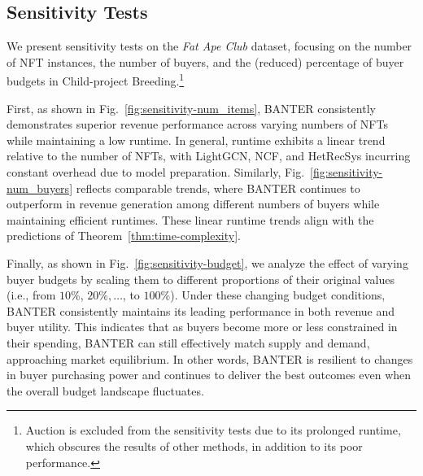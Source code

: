 \documentclass[conference]{IEEEtran}
\theoremstyle{plain}
\begin{document}
{\subsection{Sensitivity Tests}

We present sensitivity tests on the \textit{Fat Ape Club} dataset, focusing on the number of NFT instances, the number of buyers, and the (reduced) percentage of buyer budgets in Child-project Breeding\xspace.\footnote{\textsf{Auction} is excluded from the sensitivity tests due to its prolonged runtime, which obscures the results of other methods, in addition to its poor performance.} 

First, as shown in Fig.~\ref{fig:sensitivity-num_items}, BANTER\xspace consistently demonstrates superior revenue performance across varying numbers of NFTs while maintaining a low runtime. In general, runtime exhibits a linear trend relative to the number of NFTs, with \textsf{LightGCN}, \textsf{NCF}, and \textsf{HetRecSys} incurring constant overhead due to model preparation. Similarly, Fig.~\ref{fig:sensitivity-num_buyers} reflects comparable trends, where BANTER\xspace continues to outperform in revenue generation among different numbers of buyers while maintaining efficient runtimes. These linear runtime trends align with the predictions of Theorem~\ref{thm:time-complexity}. 

Finally, as shown in Fig.~\ref{fig:sensitivity-budget}, we analyze the effect of varying buyer budgets by scaling them to different proportions of their original values (i.e., from $10\%$, $20\%, \ldots$, to $100\%$). Under these changing budget conditions, BANTER\xspace consistently maintains its leading performance in both revenue and buyer utility. This indicates that as buyers become more or less constrained in their spending, BANTER\xspace can still effectively match supply and demand, approaching market equilibrium. In other words, BANTER\xspace is resilient to changes in buyer purchasing power and continues to deliver the best outcomes even when the overall budget landscape fluctuates.
}
\end{document}
